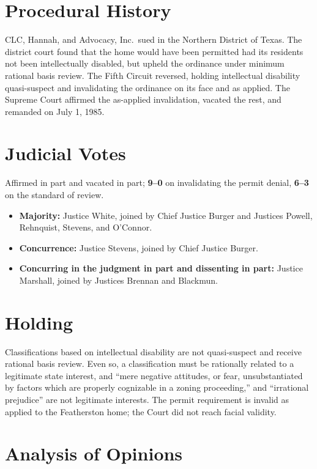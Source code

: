 \documentclass[12pt]{article}
\begin{document}
\section{Procedural History}

CLC, Hannah, and Advocacy, Inc.\ sued in the Northern District of Texas. The district court found that the home would have been permitted had its residents not been intellectually disabled, but upheld the ordinance under minimum rational basis review. The Fifth Circuit reversed, holding intellectual disability quasi-suspect and invalidating the ordinance on its face and as applied. The Supreme Court affirmed the as-applied invalidation, vacated the rest, and remanded on July 1, 1985.

\section{Judicial Votes}

Affirmed in part and vacated in part; \textbf{9--0} on invalidating the permit denial, \textbf{6--3} on the standard of review.
\begin{itemize}
\item \textbf{Majority:} Justice White, joined by Chief Justice Burger and Justices Powell, Rehnquist, Stevens, and O'Connor.
\item \textbf{Concurrence:} Justice Stevens, joined by Chief Justice Burger.
\item \textbf{Concurring in the judgment in part and dissenting in part:} Justice Marshall, joined by Justices Brennan and Blackmun.
\end{itemize}

\section{Holding}

Classifications based on intellectual disability are not quasi-suspect and receive rational basis review. Even so, a classification must be rationally related to a legitimate state interest, and ``mere negative attitudes, or fear, unsubstantiated by factors which are properly cognizable in a zoning proceeding,'' and ``irrational prejudice'' are not legitimate interests. The permit requirement is invalid as applied to the Featherston home; the Court did not reach facial validity.

\section{Analysis of Opinions}
\end{document}
